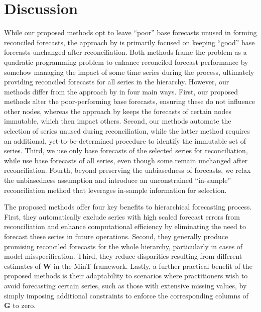 \documentclass[
  11pt]{article}
\theoremstyle{plain}
\theoremstyle{remark}
\begin{document}
\section{Discussion}\label{sec-discussion}

While our proposed methods opt to leave ``poor'' base forecasts unused
in forming reconciled forecasts, the approach by \citet{Zhang2023-op} is
primarily focused on keeping ``good'' base forecasts unchanged after
reconciliation. Both methods frame the problem as a quadratic
programming problem to enhance reconciled forecast performance by
somehow managing the impact of some time series during the process,
ultimately providing reconciled forecasts for all series in the
hierarchy. However, our methods differ from the approach by
\citet{Zhang2023-op} in four main ways. First, our proposed methods
alter the poor-performing base forecasts, ensuring these do not
influence other nodes, whereas the approach by \citet{Zhang2023-op}
keeps the forecasts of certain nodes immutable, which then impact
others. Second, our methods automate the selection of series unused
during reconciliation, while the latter method requires an additional,
yet-to-be-determined procedure to identify the immutable set of series.
Third, we use only base forecasts of the selected series for
reconciliation, while \citet{Zhang2023-op} use base forecasts of all
series, even though some remain unchanged after reconciliation. Fourth,
beyond preserving the unbiasedness of forecasts, we relax the
unbiasedness assumption and introduce an unconstrained ``in-sample''
reconciliation method that leverages in-sample information for
selection.

The proposed methods offer four key benefits to hierarchical forecasting
process. First, they automatically exclude series with high scaled
forecast
errors
from reconciliation and enhance computational efficiency by eliminating
the need to forecast these series in future
operations.
Second, they generally produce promising reconciled forecasts for the
whole hierarchy, particularly in cases of model misspecification. Third,
they reduce disparities resulting from different estimates of \(\bm{W}\)
in the MinT framework. Lastly, a further practical benefit of the
proposed methods is their adaptability to scenarios where practitioners
wish to avoid forecasting certain series, such as those with extensive
missing values, by simply imposing additional constraints to enforce the
corresponding columns of \(\bm{G}\) to zero.
\end{document}
